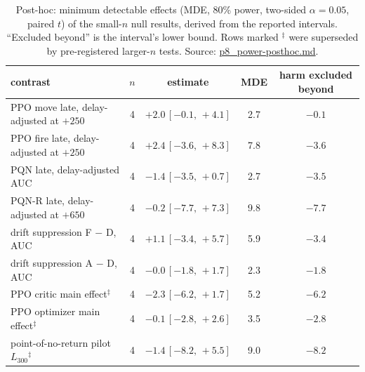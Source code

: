 \documentclass[10pt]{article} %
\newcommand{\ci}[2]{\,[#1,\,#2]}
\begin{document}
\begin{table}[h]
\centering
\caption{Post-hoc: minimum detectable effects (MDE, 80\% power, two-sided $\alpha=0.05$, paired $t$) of the small-$n$ null results, derived from the reported intervals. ``Excluded beyond'' is the interval's lower bound. Rows marked $^\ddagger$ were superseded by pre-registered larger-$n$ tests. Source: \url{p8_power-posthoc.md}.}
\label{tab:power}
\small
\begin{tabular}{lcccc}
\toprule
contrast & $n$ & estimate & MDE & harm excluded beyond \\
\midrule
PPO move late, delay-adjusted at $+250$ & 4 & $+2.0\ci{-0.1}{+4.1}$ & 2.7 & $-0.1$ \\
PPO fire late, delay-adjusted at $+250$ & 4 & $+2.4\ci{-3.6}{+8.3}$ & 7.8 & $-3.6$ \\
PQN late, delay-adjusted AUC & 4 & $-1.4\ci{-3.5}{+0.7}$ & 2.7 & $-3.5$ \\
PQN-R late, delay-adjusted at $+650$ & 4 & $-0.2\ci{-7.7}{+7.3}$ & 9.8 & $-7.7$ \\
drift suppression F $-$ D, AUC & 4 & $+1.1\ci{-3.4}{+5.7}$ & 5.9 & $-3.4$ \\
drift suppression A $-$ D, AUC & 4 & $-0.0\ci{-1.8}{+1.7}$ & 2.3 & $-1.8$ \\
PPO critic main effect$^\ddagger$ & 4 & $-2.3\ci{-6.2}{+1.7}$ & 5.2 & $-6.2$ \\
PPO optimizer main effect$^\ddagger$ & 4 & $-0.1\ci{-2.8}{+2.6}$ & 3.5 & $-2.8$ \\
point-of-no-return pilot $L_{300}$$^\ddagger$ & 4 & $-1.4\ci{-8.2}{+5.5}$ & 9.0 & $-8.2$ \\
\bottomrule
\end{tabular}
\end{table}
\end{document}
